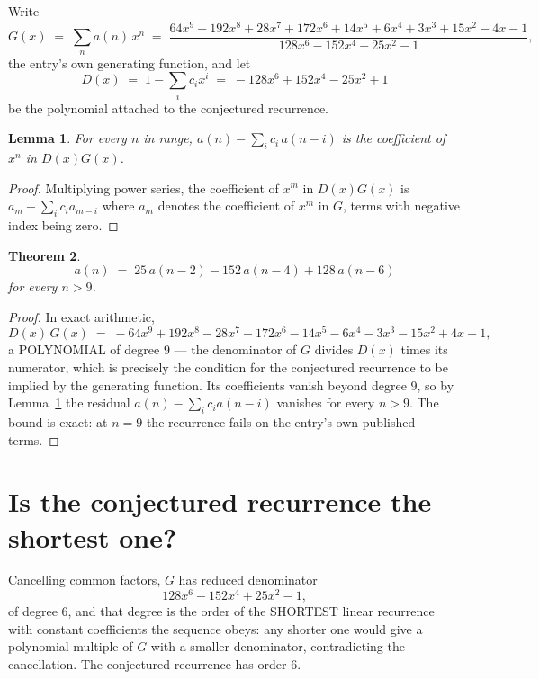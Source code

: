 \documentclass[11pt,a4paper]{article}
\theoremstyle{plain}
\newtheorem{theorem}{Theorem}
\newtheorem{lemma}[theorem]{Lemma}
\theoremstyle{definition}
\begin{document}
Write
\[
G(x)\;=\;\sum_{n}a(n)\,x^{n}\;=\;\frac{64 x^{9} - 192 x^{8} + 28 x^{7} + 172 x^{6} + 14 x^{5} + 6 x^{4} + 3 x^{3} + 15 x^{2} - 4 x - 1}{128 x^{6} - 152 x^{4} + 25 x^{2} - 1},
\]
the entry's own generating function, and let
\[
D(x)\;=\;1-\sum_i c_i x^{i}\;=\;- 128 x^{6} + 152 x^{4} - 25 x^{2} + 1
\]
be the polynomial attached to the conjectured recurrence.

\begin{lemma}\label{lem:key}
For every $n$ in range, $a(n)-\sum_i c_i\,a(n-i)$ is the coefficient of $x^{n}$ in
$D(x)G(x)$.
\end{lemma}

\begin{proof}
Multiplying power series, the coefficient of $x^{m}$ in $D(x)G(x)$ is
$a_m-\sum_i c_i a_{m-i}$ where $a_m$ denotes the coefficient of $x^{m}$ in $G$, terms with
negative index being zero.
\end{proof}

\begin{theorem}
\[
a(n)\;=\;25\,a(n-2) - 152\,a(n-4) + 128\,a(n-6)
\]
for every $n>9$.
\end{theorem}

\begin{proof}
In exact arithmetic,
\[
D(x)\,G(x)\;=\;- 64 x^{9} + 192 x^{8} - 28 x^{7} - 172 x^{6} - 14 x^{5} - 6 x^{4} - 3 x^{3} - 15 x^{2} + 4 x + 1,
\]
a POLYNOMIAL of degree $9$ --- the denominator of $G$ divides $D(x)$ times its numerator,
which is precisely the condition for the conjectured recurrence to be implied by the
generating function. Its coefficients vanish beyond degree $9$, so by
Lemma~\ref{lem:key} the residual $a(n)-\sum_ic_ia(n-i)$ vanishes for every
$n>9$. The bound is exact: at $n=9$ the recurrence fails on the entry's own published terms.
\end{proof}

\section{Is the conjectured recurrence the shortest one?}

Cancelling common factors, $G$ has reduced denominator
\[
128 x^{6} - 152 x^{4} + 25 x^{2} - 1,
\]
of degree $6$, and that degree is the order of the SHORTEST linear recurrence with
constant coefficients the sequence obeys: any shorter one would give a polynomial multiple of
$G$ with a smaller denominator, contradicting the cancellation. The conjectured recurrence has
order $6$.
\end{document}
